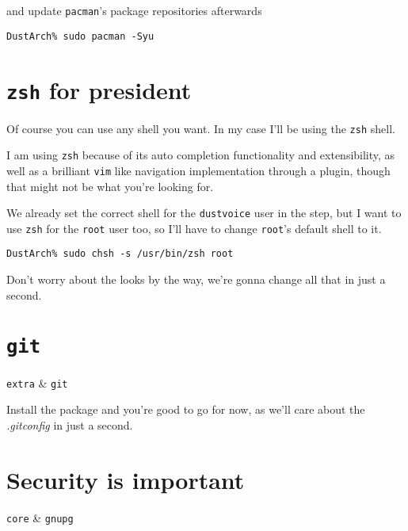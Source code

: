 \documentclass[10pt]{dustdoc}
\begin{document}
\noindent
and update \texttt{pacman}'s package repositories afterwards

\begin{verbatim}
DustArch% sudo pacman -Syu
\end{verbatim}

\section{\texttt{zsh} for president}
\label{sec:zsh-for-president}

Of course you can use any shell you want.
In my case I’ll be using the \texttt{zsh} shell.

\begin{NOTE}
    I am using \texttt{zsh} because of its auto completion functionality and extensibility, as well as a brilliant \texttt{vim} like navigation implementation through a plugin, though that might not be what you’re looking for.
\end{NOTE}

We already set the correct shell for the \texttt{dustvoice} user in the  step, but I want to use \texttt{zsh} for the \texttt{root} user too, so I’ll have to change \texttt{root}'s default shell to it.

\begin{verbatim}
DustArch% sudo chsh -s /usr/bin/zsh root
\end{verbatim}

Don’t worry about the looks by the way, we’re gonna change all that in just a second.

\section{\texttt{git}}
\label{sec:git}

\begin{packagetable}
    \texttt{extra} & \texttt{git} \\
\end{packagetable}

Install the package and you’re good to go for now, as we’ll care about the \textit{.gitconfig} in just a second.

\section{Security is important}
\label{sec:security-is-important}

\begin{packagetable}
    \texttt{core} & \texttt{gnupg} \\
\end{packagetable}
\end{document}
